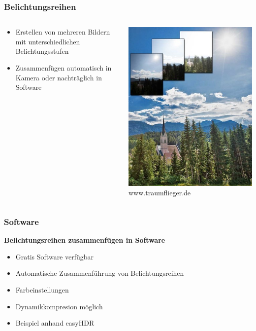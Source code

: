 \documentclass{beamer}
\begin{document}
	\begin{frame}
	\frametitle{Belichtungsreihen}
	\begin{columns}
		\begin{column}{0.55\textwidth}
			\begin{itemize}[label=\textcolor{red!65!black}{\textbullet}]
				\item Erstellen von mehreren Bildern mit unterschiedlichen Belichtungsstufen	
				\item Zusammenfügen automatisch in Kamera oder nachträglich in Software
			\end{itemize}
		\end{column}
		\begin{column}{0.45\textwidth}
			\includegraphics[scale=0.5]{img/bild9.jpg}
			\tiny www.traumflieger.de
		\end{column}
	\end{columns}
	\end{frame}

	\begin{frame}
	\frametitle{Software}
	\textbf{Belichtungsreihen zusammenfügen in Software}
	\begin{itemize}[label=\textcolor{red!65!black}{\textbullet}]
		\item Gratis Software verfügbar
		\item Automatische Zusammenführung von Belichtungsreihen
		\item Farbeinstellungen
		\item Dynamikkompresion möglich
		\item Beispiel anhand easyHDR
	\end{itemize}
	\end{frame}
\end{document}
